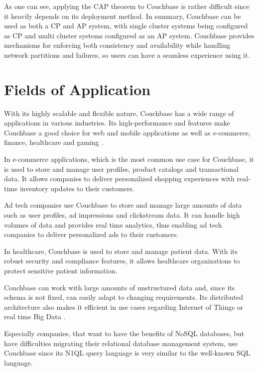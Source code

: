 As one can see, applying the \ac{CAP} theorem to Couchbase is rather difficult since it heavily depends on its deployment method. In summary, Couchbase can be used as both a \ac{CP} and \ac{AP} system, with single cluster systems being configured as \ac{CP} and multi cluster systems configured as an \ac{AP} system. Couchbase provides mechanisms for enforcing both consistency and availability while handling network partitions and failures, so users can have a seamless experience using it.

\section{Fields of Application}

With its highly scalable and flexible nature, Couchbase has a wide range of applications in various industries. Its high-performance and features make Couchbase a good choice for web and mobile applications as well as e-commerce, finance, healthcare and gaming \parencite{Couchbase.20230329}.

In e-commerce applications, which is the most common use case for Couchbase, it is used to store and manage user profiles, product catalogs and transactional data. It allows companies to deliver personalized shopping experiences with real-time inventory updates to their customers.

Ad tech companies use Couchbase to store and manage large amounts of data such as user profiles, ad impressions and clickstream data. It can handle high volumes of data and provides real time analytics, thus enabling ad tech companies to deliver personalized ads to their customers.

In healthcare, Couchbase is used to store and manage patient data. With its robust security and compliance features, it allows healthcare organizations to protect sensitive patient information.

Couchbase can work with large amounts of unstructured data and, since its schema is not fixed, can easily adapt to changing requirements. Its distributed architecture also makes it efficient in use cases regarding Internet of Things or real time Big Data \parencite{StudentCouchbase.}.

Especially companies, that want to have the benefits of \ac{NoSQL} databases, but have difficulties migrating their relational database management system, use Couchbase since its \ac{N1QL} query language is very similar to the well-known \ac{SQL} language.

